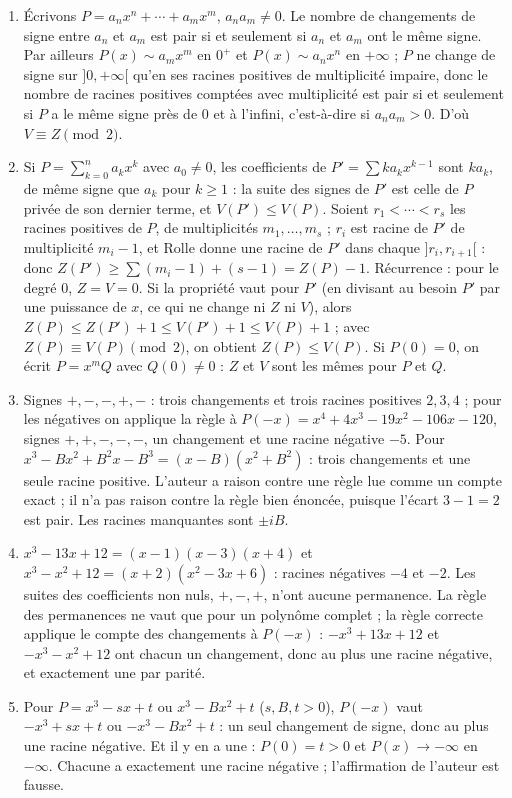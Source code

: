 \documentclass[11pt,a4paper]{article}
\begin{document}
\begin{solution}
\begin{enumerate}
\item Écrivons $P = a_nx^n + \cdots + a_mx^m$, $a_n a_m \ne 0$. Le nombre de
  changements de signe entre $a_n$ et $a_m$ est pair si et seulement si $a_n$ et
  $a_m$ ont le même signe. Par ailleurs $P(x) \sim a_mx^m$ en $0^+$ et
  $P(x) \sim a_nx^n$ en $+\infty$ ; $P$ ne change de signe sur $]0, +\infty[$
  qu'en ses racines positives de multiplicité impaire, donc le nombre de racines
  positives comptées avec multiplicité est pair si et seulement si $P$ a le même
  signe près de $0$ et à l'infini, c'est-à-dire si $a_na_m > 0$. D'où
  $V \equiv Z \pmod 2$.
\item Si $P = \sum_{k=0}^n a_kx^k$ avec $a_0 \ne 0$, les coefficients de
  $P' = \sum k a_k x^{k-1}$ sont $ka_k$, de même signe que $a_k$ pour $k \ge 1$ :
  la suite des signes de $P'$ est celle de $P$ privée de son dernier terme, et
  $V(P') \le V(P)$. Soient $r_1 < \cdots < r_s$ les racines positives de $P$, de
  multiplicités $m_1, \dots, m_s$ ; $r_i$ est racine de $P'$ de multiplicité
  $m_i - 1$, et Rolle donne une racine de $P'$ dans chaque $]r_i, r_{i+1}[$ : donc
  $Z(P') \ge \sum(m_i - 1) + (s - 1) = Z(P) - 1$. Récurrence : pour le degré $0$,
  $Z = V = 0$. Si la propriété vaut pour $P'$ (en divisant au besoin $P'$ par une
  puissance de $x$, ce qui ne change ni $Z$ ni $V$), alors
  $Z(P) \le Z(P') + 1 \le V(P') + 1 \le V(P) + 1$ ; avec $Z(P) \equiv V(P)
  \pmod 2$, on obtient $Z(P) \le V(P)$. Si $P(0) = 0$, on écrit $P = x^mQ$ avec
  $Q(0) \ne 0$ : $Z$ et $V$ sont les mêmes pour $P$ et $Q$.
\item Signes $+,-,-,+,-$ : trois changements et trois racines positives $2, 3, 4$ ;
  pour les négatives on applique la règle à $P(-x) = x^4 + 4x^3 - 19x^2 - 106x - 120$,
  signes $+,+,-,-,-$, un changement et une racine négative $-5$. Pour
  $x^3 - Bx^2 + B^2x - B^3 = (x - B)(x^2 + B^2)$ : trois changements et une seule
  racine positive. L'auteur a raison contre une règle lue comme un compte exact ;
  il n'a pas raison contre la règle bien énoncée, puisque l'écart $3 - 1 = 2$ est
  pair. Les racines manquantes sont $\pm iB$.
\item $x^3 - 13x + 12 = (x-1)(x-3)(x+4)$ et $x^3 - x^2 + 12 = (x+2)(x^2 - 3x + 6)$ :
  racines négatives $-4$ et $-2$. Les suites des coefficients non nuls, $+,-,+$,
  n'ont aucune permanence. La règle des permanences ne vaut que pour un polynôme
  complet ; la règle correcte applique le compte des changements à $P(-x)$ :
  $-x^3 + 13x + 12$ et $-x^3 - x^2 + 12$ ont chacun un changement, donc au plus une
  racine négative, et exactement une par parité.
\item Pour $P = x^3 - sx + t$ ou $x^3 - Bx^2 + t$ ($s, B, t > 0$), $P(-x)$ vaut
  $-x^3 + sx + t$ ou $-x^3 - Bx^2 + t$ : un seul changement de signe, donc au plus
  une racine négative. Et il y en a une : $P(0) = t > 0$ et
  $P(x) \to -\infty$ en $-\infty$. Chacune a exactement une racine négative ;
  l'affirmation de l'auteur est fausse.
\end{enumerate}


\end{solution}
\end{document}
